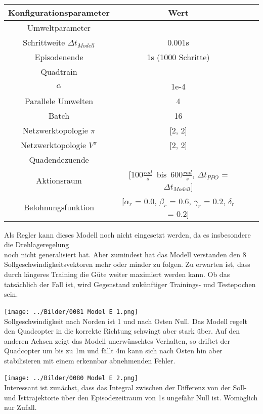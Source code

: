 \vspace*{0.5cm}
\begin{center}
\begin{tabular}[h]{|c|c|c|c|}
\hline 
Konfigurationsparameter & Wert \\
\hline 
Umweltparameter & \\
Schrittweite $\Delta t_{Modell}$ & 0.001s \\
Episodenende & 1s (1000 Schritte)\\
\hline
Quadtrain & \\
$\alpha$ & 1e-4\\
Parallele Umwelten & 4\\
Batch & 16\\
Netzwerktopologie $\pi$ & [2, 2]\\
Netzwerktopologie $V^{\pi}$ & [2, 2]\\
\hline
Quadendezuende & \\
Aktionsraum & [100$\frac{rad}{s}$\ bis\ 600$\frac{rad}{s}$, $\Delta t_{PPO}$ = $\Delta t_{Modell}$]\\
Belohnungsfunktion & [$\alpha_r$ = 0.0, $\beta_r$ = 0.6, $\gamma_r$ = 0.2, $\delta_r$ = 0.2]\\
\hline
\end{tabular}
\end{center}
\vspace*{0.5cm}
Als Regler kann dieses Modell noch nicht eingesetzt werden, da es insbesondere die Drehlageregelung\\ noch nicht generalisiert hat. Aber zumindest hat das Modell verstanden den 8 Sollgeschwindigkeitsvektoren mehr oder minder zu folgen. Zu erwarten ist, dass durch längeres Training die Güte weiter maximiert werden kann. Ob das tatsächlich der Fall ist, wird Gegenstand zukünftiger Trainings- und Testepochen sein.
\begin{center}
	\texttt{[image: ../Bilder/0081 Model E 1.png]}{\\Sollgeschwindigkeit nach Norden ist 1 und nach Osten Null. Das Modell regelt den Quadcopter in die korrekte Richtung schwingt aber stark über. Auf den anderen Achsen zeigt das Modell unerwünschtes Verhalten, so driftet der Quadcopter um bis zu 1m und fällt 4m kann sich nach Osten hin aber stabilisieren mit einem erkennbar abnehmenden Fehler.}
\end{center}
\begin{center}
	\texttt{[image: ../Bilder/0080 Model E 2.png]}{\\Interessant ist zunächst, dass das Integral zwischen der Differenz von der Soll- und Isttrajektorie über den Episodezeitraum von 1s ungefähr Null ist. Womöglich nur Zufall.}
\end{center}
